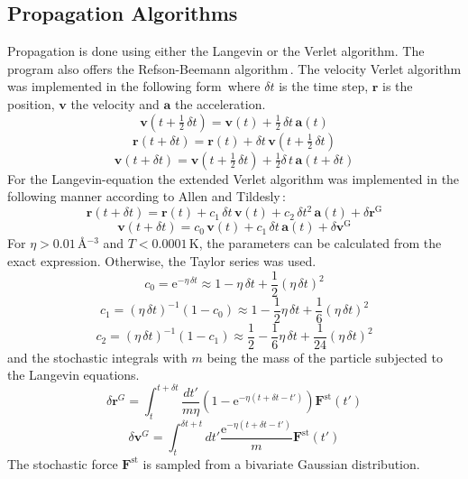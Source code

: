 \documentclass[twoside, 11pt, titlepage, captions=nooneline, a4paper, headsepline]{scrbook}%
\begin{document}
\subsection{Propagation Algorithms}
Propagation is done using either the Langevin or the Verlet algorithm. The program also offers the Refson-Beemann algorithm\,\cite{refson1985}. The velocity Verlet algorithm was implemented in the following form\,\cite{allen1989} where $\delta t$ is the time step, $\mathbf{r}$ is the position, $\mathbf{v}$ the velocity and $\mathbf{a}$ the acceleration. 
\begin{equation}\label{Eq:Verlet_v1}
\mathbf{v}(t+\tfrac{1}{2}\,\delta t)=\mathbf{v}(t)+\tfrac{1}{2}\,\delta t \,\mathbf{a}(t)
\end{equation}
\begin{equation}\label{Eq:Verlet_r1}
\mathbf{r}(t+\delta t)=\mathbf{r}(t)+\delta t\, \mathbf{v}(t+\tfrac{1}{2}\,\delta t)
\end{equation}
\begin{equation}\label{Eq:Verlet_v2}
\mathbf{v}(t+\delta t)=\mathbf{v}(t+\tfrac{1}{2}\,\delta t)+ \tfrac{1}{2}\delta\, t\,\mathbf{a}(t+\delta t)
\end{equation}
For the Langevin-equation the extended Verlet algorithm was implemented in the following manner according to Allen and Tildesly\,\cite{allen1989}:
\begin{equation}\label{Eq:Langevin_r}
\mathbf{r}(t+\delta t)=\mathbf{r}(t)+c_1\,\delta t\,\mathbf{v}(t)+c_2\,\delta t^2\,\mathbf{a}(t)+\delta\mathbf{r}^\mathrm{G}
\end{equation}
\begin{equation}\label{Eq:Langevin_v}
\mathbf{v}(t+\delta t)=c_0\,\mathbf{v}(t)+c_1\,\delta t\,\mathbf{a}(t)+\delta\mathbf{v}^\mathrm{G}
\end{equation}
For $\eta>0.01$\,\AA$^{-3}$ and $T<0.0001$\,K, the parameters can be calculated from the exact expression. Otherwise, the Taylor series was used.
\begin{equation}
c_0=\mathrm{e}^{-\eta\,\delta t}\approx 1-\eta\,\delta t+\frac{1}{2} (\eta\,\delta t)^2
\end{equation}
\begin{equation}
c_1=(\eta\,\delta t)^{-1}(1-c_0)\approx 1-\frac{1}{2}\eta\,\delta t+\frac{1}{6}(\eta\,\delta t)^2
\end{equation}
\begin{equation}
c_2=(\eta\,\delta t)^{-1}(1-c_1)\approx \frac{1}{2}-\frac{1}{6}\eta\,\delta t+\frac{1}{24}(\eta\,\delta t)^2
\end{equation}
and the stochastic integrals with $m$ being the mass of the particle subjected to the Langevin equations.
\begin{equation}
\delta \mathbf{r}^G=\int_t^{t+\delta t} \frac{dt'}{m \eta}(1-\mathrm{e}^{-\eta(t+\delta t-t')})\mathbf{F}^\mathrm{st}(t')
\end{equation}
\begin{equation}
\delta \mathbf{v}^G=\int_t^{\delta t+t} dt' \frac{\mathrm{e}^{-\eta(t+\delta t-t')}}{m}\mathbf{F}^\mathrm{st}(t')
\end{equation}
The stochastic force $\mathbf{F}^\mathrm{st}$ is sampled from a bivariate Gaussian distribution.
\end{document}
